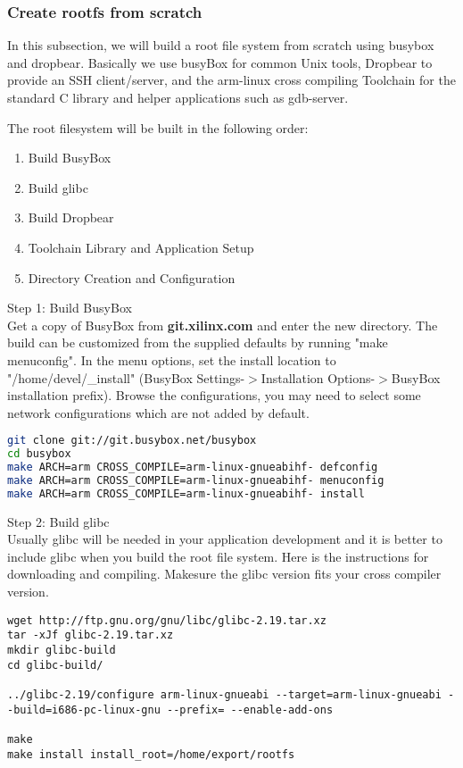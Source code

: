 \documentclass[12pt]{article} %
\begin{document}
\subsubsection{Create rootfs from scratch}
In this subsection, we will build a root file system from scratch using busybox and dropbear. 
Basically we use busyBox for common Unix tools, Dropbear to provide an SSH client/server, and the arm-linux 
cross compiling Toolchain for the standard C library and helper applications such as gdb-server.

The root filesystem will be built in the following order:
\begin{enumerate}
    \item Build BusyBox
    \item Build glibc
    \item Build Dropbear
    \item Toolchain Library and Application Setup
    \item Directory Creation and Configuration
\end{enumerate}

Step 1: Build BusyBox \\
Get a copy of BusyBox from \textbf{git.xilinx.com} and enter the new directory.
The build can be customized from the supplied defaults by running "make menuconfig".
In the menu options, set the install location to "/home/devel/\_install" 
(BusyBox Settings-$>$Installation Options-$>$BusyBox installation prefix).
Browse the configurations, you may need to select some network configurations 
which are not added by default.
\begin{lstlisting}[language=bash]
git clone git://git.busybox.net/busybox
cd busybox
make ARCH=arm CROSS_COMPILE=arm-linux-gnueabihf- defconfig
make ARCH=arm CROSS_COMPILE=arm-linux-gnueabihf- menuconfig
make ARCH=arm CROSS_COMPILE=arm-linux-gnueabihf- install
\end{lstlisting}

Step 2: Build glibc \\
Usually glibc will be needed in your application development and it is better to 
include glibc when you build the root file system. Here is the instructions for 
downloading and compiling. Makesure the glibc version fits your 
cross compiler version.

\begin{lstlisting}
wget http://ftp.gnu.org/gnu/libc/glibc-2.19.tar.xz
tar -xJf glibc-2.19.tar.xz
mkdir glibc-build
cd glibc-build/

../glibc-2.19/configure arm-linux-gnueabi --target=arm-linux-gnueabi --build=i686-pc-linux-gnu --prefix= --enable-add-ons

make
make install install_root=/home/export/rootfs 
\end{lstlisting}
\end{document}
